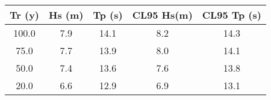 \begin{tabular}{ccccc}
Tr (y)& Hs (m)& Tp (s)& CL95 Hs(m)& CL95 Tp (s) \\\hline
100.0 & 7.9 & 14.1 & 8.2 & 14.3 \\
75.0 & 7.7 & 13.9 & 8.0 & 14.1 \\
50.0 & 7.4 & 13.6 & 7.6 & 13.8 \\
20.0 & 6.6 & 12.9 & 6.9 & 13.1 \\
\hline
\end{tabular}
